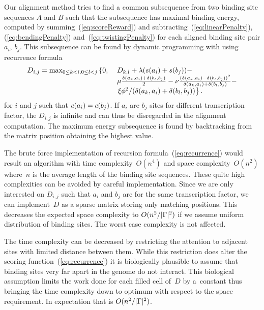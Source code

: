 Our alignment method tries to find a common subsequence from two binding site
sequences $A$ and $B$ such that the subsequence has maximal binding
energy, computed by summing~(\ref{eq:scoreReward}) and
subtracting~(\ref{eq:linearPenalty}), (\ref{eq:bendingPenalty})
and~(\ref{eq:twistingPenalty}) for each aligned binding site pair
$a_i$, $b_j$. This subsequence can be found by dynamic programming
with using recurrence formula
\begin{equation}
  \label{eq:recurrence}
  \begin{array}{ll}
D_{i,j} = \max_{ 0\le k <i, 0\le l<j} \left\{ 0,\right. & %
    D_{k,l}+\lambda(\Score{a_i}+\Score{b_j}) -  \\%
    &  \mu\frac{\sdist{a_k}{a_i}+\sdist{b_l}{b_j}}{2} - %
    \nu
    \frac{(\sdist{a_k}{a_i}-\sdist{b_l}{b_j})^2}{\sdist{a_k}{a_i}+\sdist{b_l}{b_j}} - \\
    
    & \left.  \xi \phi^2/(\sdist{a_k}{a_i}+\sdist{b_l}{b_j})\right\}.
  \end{array}
\end{equation}
for $i$ and $j$ such that $c({a_i})=c({b_j})$. If $a_i$ are $b_j$ sites
for different transcription factor, the $D_{i,j}$ is infinite and can
thus be disregarded in the alignment computation.
The maximum energy subsequence is found by backtracking from the matrix
position obtaining the highest value.

The brute force implementation of recursion
formula~(\ref{eq:recurrence}) would result an algorithm with time
complexity~$O(n^4)$ and space complexity~$O(n^2)$ where~$n$ is the
average length of the binding site sequences. These quite high
complexities can be avoided by careful implementation. Since we are
only interested on $D_{i,j}$ such that $a_i$ and $b_j$ are for the
same transcription factor, we can implement~$D$ as a sparse matrix
storing only matching positions. This decreases the expected space complexity
to $O(n^2/|\Gamma|^2)$ if we assume uniform distribution of binding
sites. The worst case complexity is not affected.

The time complexity can be decreased by restricting the attention to
adjacent sites with limited distance between them. While this
restriction does alter the scoring function~(\ref{eq:recurrence}) it
is biologically plausible to assume that binding sites very far apart
in the genome do not interact. This biological assumption limits the
work done for each filled cell of~$D$ by a~constant thus bringing the
time complexity down to optimum with respect to the space
requirement. In expectation that is $O(n^2/|\Gamma|^2)$.


